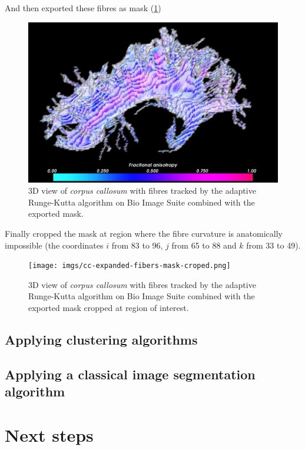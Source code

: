 \documentclass[a4paper,11pt]{report}
\begin{document}
  And then exported these fibres as mask (\ref{fig:fibres-mask})

  \begin{figure}[H]
    \includegraphics[width=1\linewidth]{imgs/cc-expanded-fibers-mask.png}
    \caption{3D view of \textit{corpus callosum} with fibres tracked by the adaptive Runge-Kutta algorithm on Bio Image Suite combined with the exported mask.}
    \label{fig:fibres-mask}
  \end{figure}

  Finally cropped the mask at region where the fibre curvature is anatomically impossible (the coordinates $i$ from 83 to 96, $j$ from 65 to 88 and $k$ from 33 to 49).

  \begin{figure}[H]
    \texttt{[image: imgs/cc-expanded-fibers-mask-croped.png]}
    \caption{3D view of \textit{corpus callosum} with fibres tracked by the adaptive Runge-Kutta algorithm on Bio Image Suite combined with the exported mask cropped at region of interest.}
    \label{fig:fibres-mask-croped}
  \end{figure}

  \section{Applying clustering algorithms}

  \section{Applying a classical image segmentation algorithm}

\chapter{Next steps}
\end{document}
